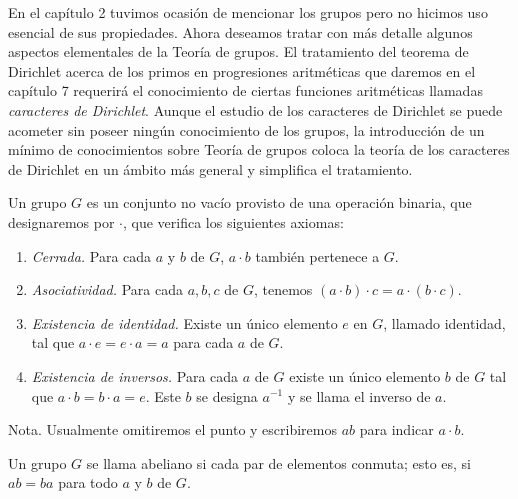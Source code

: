 \documentclass[12pt,a4paper]{book}
\begin{document}
    En el capítulo 2 tuvimos ocasión de mencionar los grupos pero no hicimos uso esencial
    de sus propiedades. Ahora deseamos tratar con más detalle algunos aspectos elementales
    de la Teoría de grupos. El tratamiento del teorema de Dirichlet acerca de los primos
    en progresiones aritméticas que daremos en el capítulo 7 requerirá el conocimiento de
    ciertas funciones aritméticas llamadas \textit{caracteres de Dirichlet}. Aunque el
    estudio de los caracteres de Dirichlet se puede acometer sin poseer ningún
    conocimiento de los grupos, la introducción de un mínimo de conocimientos sobre Teoría
    de grupos coloca la teoría de los caracteres de Dirichlet en un ámbito más general y
    simplifica el tratamiento.

    \begin{definicion}
        Un grupo $G$ es un conjunto no vacío provisto de una operación binaria, que
        designaremos por $\cdot$, que verifica los siguientes axiomas:
        \begin{enumerate}
            \item[(a)] \textit{Cerrada.} Para cada $a$ y $b$ de $G$, $a\cdot b$ también
            pertenece a $G$.
            \item[(b)] \textit{Asociatividad.} Para cada $a,b,c$ de $G$, tenemos
            $(a\cdot b)\cdot c=a\cdot(b\cdot c)$.
            \item[(c)] \textit{Existencia de identidad.} Existe un único elemento $e$ en
            $G$, llamado identidad, tal que $a\cdot e=e\cdot a=a$ para cada $a$ de $G$.
            \item[(d)] \textit{Existencia de inversos.} Para cada $a$ de $G$ existe un
            único elemento $b$ de $G$ tal que $a\cdot b=b\cdot a=e$. Este $b$ se designa
            $a^{-1}$ y se llama el inverso de $a$.
        \end{enumerate}
    \end{definicion}

    Nota. Usualmente omitiremos el punto y escribiremos $ab$ para indicar $a\cdot b$.

    \begin{definicion}
        Un grupo $G$ se llama abeliano si cada par de elementos conmuta; esto es, si
        $ab=ba$ para todo $a$ y $b$ de $G$.
    \end{definicion}
\end{document}
